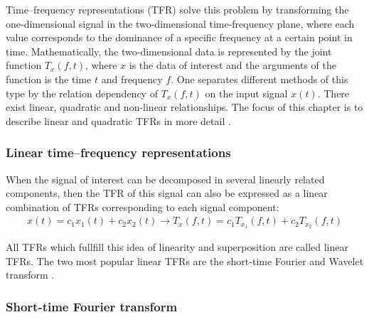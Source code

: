 Time–frequency representations (TFR) solve this problem by transforming the one-dimensional signal in the two-dimensional time-frequency plane, where each value corresponds to the dominance of a specific frequency at a certain point in time. Mathematically, the two-dimensional data is represented by the joint function $T_{x}(f,t)$, where $x$ is the data of interest and the arguments of the function is the time  $t$ and frequency  $f$. One separates different methods of this type by the relation dependency of $T_{x}(f,t)$ on the input signal $x(t)$. There exist linear, quadratic and non-linear relationships. The focus of this chapter is to describe linear and quadratic TFRs in more detail \cite{Hlawatsch1992}. 

\subsubsection{Linear time–frequency representations}
When the signal of interest can be decomposed in several linearly related components, then the TFR of this signal can also be expressed as a linear combination of TFRs corresponding to each signal component:
\begin{equation}
    \begin{aligned}
        x(t) = c_{1} x_{1}(t) + c_{2} x_{2}(t) \rightarrow T_{x}(f,t) = c_{1} T_{x_{1}}(f,t) + c_{2} T_{x_{2}}(f,t)
    \end{aligned}
\end{equation}


All TFRs which fullfill this idea of linearity and superposition are called linear TFRs. The two most popular linear TFRs are the short-time Fourier and Wavelet transform \cite{Hlawatsch1992}. 
\subsubsection{Short-time Fourier transform}

